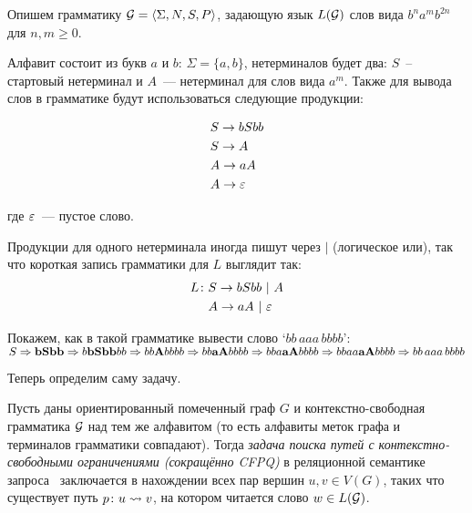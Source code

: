 \begin{example}\label{example:bab}
  Опишем грамматику $\mathcal{G} = \langle \Sigma, N, S, P \rangle$, задающую язык $L(\mathcal{G})$ слов вида $b^n a^m b^{2n}$ для $n, m \ge 0$.

  Алфавит состоит из букв $a$ и $b$: $\Sigma = \{ a, b \}$, нетерминалов будет два: $S$~-- стартовый нетерминал и $A$~--- нетерминал для слов вида $a^m$. Также для вывода слов в грамматике будут использоваться следующие продукции:

  \begin{align*}
    &S \rightarrow b S bb \\
    &S \rightarrow A \\
    &A \rightarrow a A \\
    &A \rightarrow \varepsilon
  \end{align*}

  где $\varepsilon$~--- пустое слово.

  Продукции для одного нетерминала иногда пишут через $|$ (логическое или), так что короткая запись грамматики для $L$ выглядит так:
  \vspace{-5pt}
  \begin{align*}
    L \colon &S \rightarrow b S bb ~|~ A \\
    &A \rightarrow aA ~|~ \varepsilon
  \end{align*}

  \vspace{-5pt}

  Покажем, как в такой грамматике вывести слово `$bb\,aaa\,bbbb$':\\ $S \Rightarrow \textbf{bSbb} \Rightarrow  b\textbf{bSbb}bb \Rightarrow bb\textbf{A}bbbb \Rightarrow bb\textbf{aA}bbbb \Rightarrow bba\textbf{aA}bbbb \Rightarrow bbaa\textbf{aA}bbbb \Rightarrow bb\,aaa\,bbbb$

\end{example}

Теперь определим саму задачу.

\begin{definition}
  Пусть даны ориентированный помеченный граф $G$ и контекстно-свободная грамматика $\mathcal{G}$ над тем же алфавитом (то есть алфавиты меток графа и терминалов грамматики совпадают).
  Тогда \textit{задача поиска путей с контекстно-свободными ограничениями (сокращённо CFPQ)} в реляционной семантике запроса~\cite{Hellings16} заключается в нахождении всех пар вершин $u, v \in V(G)$, таких что существует путь $p \colon u \rightsquigarrow v$, на котором читается слово $w \in L(\mathcal{G})$.

\end{definition}

